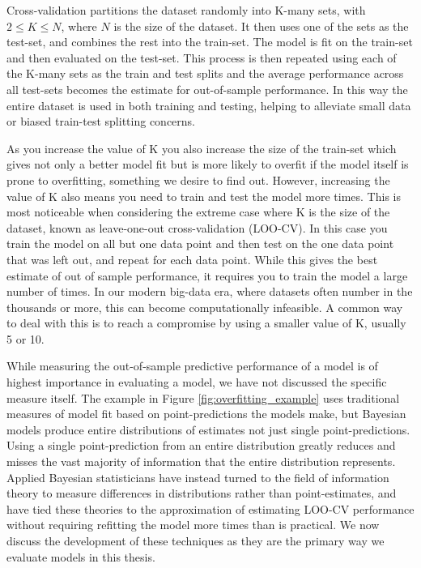 Cross-validation partitions the dataset randomly into K-many sets, with $2 \leq K \leq N$, where $N$ is the size of the dataset. It then uses one of the sets as the test-set, and combines the rest into the train-set. The model is fit on the train-set and then evaluated on the test-set. This process is then repeated using each of the K-many sets as the train and test splits and the average performance across all test-sets becomes the estimate for out-of-sample performance. In this way the entire dataset is used in both training and testing, helping to alleviate small data or biased train-test splitting concerns.

As you increase the value of K you also increase the size of the train-set which gives not only a better model fit but is more likely to overfit if the model itself is prone to overfitting, something we desire to find out. However, increasing the value of K also means you need to train and test the model more times. This is most noticeable when considering the extreme case where K is the size of the dataset, known as leave-one-out cross-validation (LOO-CV). In this case you train the model on all but one data point and then test on the one data point that was left out, and repeat for each data point. While this gives the best estimate of out of sample performance, it requires you to train the model a large number of times. In our modern big-data era, where datasets often number in the thousands or more, this can become computationally infeasible. A common way to deal with this is to reach a compromise by using a smaller value of K, usually 5 or 10.

While measuring the out-of-sample predictive performance of a model is of highest importance in evaluating a model, we have not discussed the specific measure itself. The example in Figure \ref{fig:overfitting_example} uses traditional measures of model fit based on point-predictions the models make, but Bayesian models produce entire distributions of estimates not just single point-predictions. Using a single point-prediction from an entire distribution greatly reduces and misses the vast majority of information that the entire distribution represents. Applied Bayesian statisticians have instead turned to the field of information theory to measure differences in distributions rather than point-estimates, and have tied these theories to the approximation of estimating LOO-CV performance without requiring refitting the model more times than is practical. We now discuss the development of these techniques as they are the primary way we evaluate models in this thesis.

